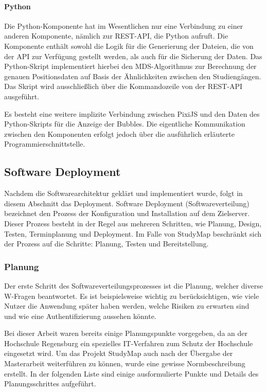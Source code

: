 \paragraph*{Python}
Die Python-Komponente hat im Wesentlichen nur eine Verbindung zu einer anderen Komponente, nämlich zur REST-API, die Python aufruft. Die Komponente enthält sowohl die Logik für die Generierung der Dateien, die von der API zur Verfügung gestellt werden, als auch für die Sicherung der Daten. Das Python-Skript implementiert hierbei den MDS-Algorithmus zur Berechnung der genauen Positionsdaten auf Basis der Ähnlichkeiten zwischen den Studiengängen. Das Skript wird ausschließlich über die Kommandozeile von der REST-API ausgeführt.

Es besteht eine weitere implizite Verbindung zwischen PixiJS und den Daten des Python-Skripts für die Anzeige der Bubbles. Die eigentliche Kommunikation zwischen den Komponenten erfolgt jedoch über die ausführlich erläuterte Programmierschnittstelle.

\newpage
\subsection{Software Deployment}\label{sec:deployment}
Nachdem die Softwarearchitektur geklärt und implementiert wurde, folgt in diesem Abschnitt das Deployment. Software Deployment (Softwareverteilung) bezeichnet den Prozess der Konfiguration und Installation auf dem Zielserver. Dieser Prozess besteht in der Regel aus mehreren Schritten, wie Planung, Design, Testen, Terminplanung und Deployment. \parencite{atera_team_was_2023} Im Falle von StudyMap beschränkt sich der Prozess auf die Schritte: Planung, Testen und Bereitstellung.

\subsubsection{Planung}
Der erste Schritt des Softwareverteilungsprozesses ist die Planung, welcher diverse W-Fragen beantwortet. Es ist beispielsweise wichtig zu berücksichtigen, wie viele Nutzer die Anwendung später haben werden, welche Risiken zu erwarten sind und wie eine Authentifizierung aussehen könnte. \parencite{atera_team_was_2023}

Bei dieser Arbeit waren bereits einige Planungspunkte vorgegeben, da an der Hochschule Regensburg ein spezielles IT-Verfahren zum Schutz der Hochschule eingesetzt wird. Um das Projekt StudyMap auch nach der Übergabe der Masterarbeit weiterführen zu können, wurde eine gewisse Normbeschreibung erstellt. In der folgenden Liste sind einige ausformulierte Punkte und Details des Planungsschrittes aufgeführt.


